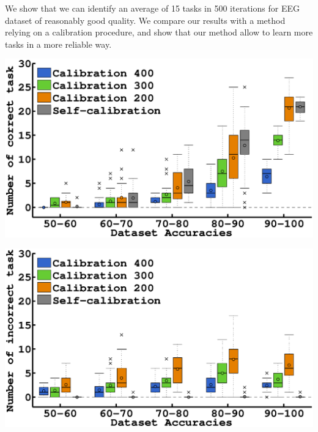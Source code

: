 \documentclass[a0,final, portrait]{inriaposter}
\begin{document}
\begin{multicols}{2}
{We show that we can identify an average of 15 tasks in 500 iterations for EEG dataset of reasonably good quality. We compare our results with a method relying on a calibration procedure, and show that our method allow to learn more tasks in a more reliable way.

\vspace{0.5cm}

\begin{center}
\begin{minipage}{.46\columnwidth}
	\begin{center}
		\includegraphics[width=\columnwidth]{images/plot_EEG_calib_nCorrect}	
	\end{center}
\end{minipage}
\begin{minipage}{.02\columnwidth}
	\begin{center}

	\end{center}
\end{minipage}
\begin{minipage}{.442\columnwidth}
	\begin{center}
		\includegraphics[width=\columnwidth]{images/plot_EEG_calib_nWrong}	
	\end{center}
\end{minipage}
\end{center}

}

{
	\nocite{*}
	
	\renewcommand{\section}[2]{}%
	
	\vspace{-10pt}
}

\end{multicols}
\vfill
\end{document}
